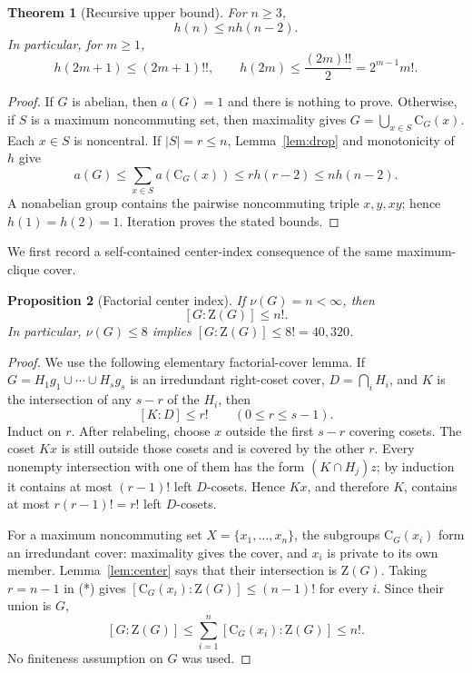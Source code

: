 \documentclass[11pt]{article}
\newtheorem{theorem}{Theorem}[section]
\newtheorem{proposition}[theorem]{Proposition}
\theoremstyle{remark}
\newcommand{\nuG}{\nu}
\newcommand{\aG}{a}
\newcommand{\Z}{\mathrm Z}
\newcommand{\CG}{\mathrm C}
\begin{document}
\begin{theorem}[Recursive upper bound]\label{thm:recurrence}
For $n\ge3$,
\[
 h(n)\le n h(n-2).
\]
In particular, for $m\ge1$,
\[
 h(2m+1)\le(2m+1)!!,\qquad
 h(2m)\le\frac{(2m)!!}{2}=2^{m-1}m!.
\]
\end{theorem}

\begin{proof}
If $G$ is abelian, then $\aG(G)=1$ and there is nothing to prove. Otherwise,
if $S$ is a maximum noncommuting set, then maximality gives
$G=\bigcup_{x\in S}\CG_G(x)$.  Each $x\in S$ is noncentral.  If
$|S|=r\le n$, Lemma~\ref{lem:drop} and monotonicity of $h$ give
\[
 \aG(G)\le\sum_{x\in S}\aG(\CG_G(x))
 \le r h(r-2)\le n h(n-2).
\]
A nonabelian group contains the pairwise noncommuting triple $x,y,xy$;
hence $h(1)=h(2)=1$.  Iteration proves the stated bounds.
\end{proof}

We first record a self-contained center-index consequence of the same
maximum-clique cover.

\begin{proposition}[Factorial center index]\label{prop:factorial-center}
If $\nuG(G)=n<\infty$, then
\[
 [G:\Z(G)]\le n!.
\]
In particular, $\nuG(G)\le8$ implies $[G:\Z(G)]\le8!=40{,}320$.
\end{proposition}

\begin{proof}
We use the following elementary factorial-cover lemma.  If
$G=H_1g_1\cup\cdots\cup H_sg_s$ is an irredundant right-coset cover,
$D=\bigcap_iH_i$, and $K$ is the intersection of any $s-r$ of the
$H_i$, then
\[
 [K:D]\le r!\qquad(0\le r\le s-1).
\tag{*}
\]
Induct on $r$.  After relabeling, choose $x$ outside the first $s-r$
covering cosets.  The coset $Kx$ is still outside those cosets and is
covered by the other $r$.  Every nonempty intersection with one of them has
the form $(K\cap H_j)z$; by induction it contains at most $(r-1)!$ left
$D$-cosets.  Hence $Kx$, and therefore $K$, contains at most
$r(r-1)!=r!$ left $D$-cosets.

For a maximum noncommuting set $X=\{x_1,\ldots,x_n\}$, the subgroups
$\CG_G(x_i)$ form an irredundant cover: maximality gives the cover, and
$x_i$ is private to its own member.  Lemma~\ref{lem:center} says that their
intersection is $\Z(G)$.  Taking $r=n-1$ in (*) gives
$[\CG_G(x_i):\Z(G)]\le(n-1)!$ for every $i$.  Since their union is $G$,
\[
 [G:\Z(G)]\le\sum_{i=1}^n[\CG_G(x_i):\Z(G)]\le n!.
\]
No finiteness assumption on $G$ was used.
\end{proof}
\end{document}
